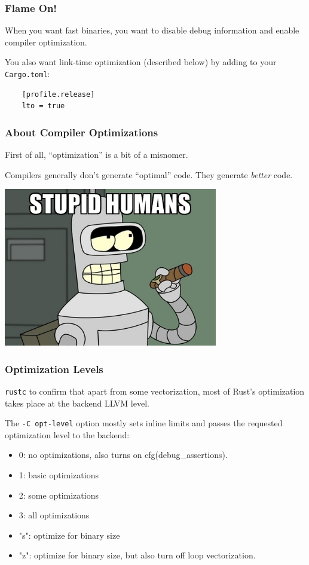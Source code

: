 \begin{frame}[fragile]
\frametitle{Flame On!}

When you want fast binaries, you want to disable debug information and enable compiler optimization.

 You also want link-time optimization (described below) by adding to your \texttt{Cargo.toml}:
\begin{verbatim}
    [profile.release]
    lto = true
\end{verbatim}
\end{frame}


\begin{frame}
\frametitle{About Compiler Optimizations}

First of all, ``optimization'' is
a bit of a misnomer. 

Compilers generally don't generate ``optimal'' code. They generate \emph{better} code.

\begin{center}
\includegraphics[width=0.7\textwidth]{images/bender.jpg}
\end{center}


\end{frame}


\begin{frame}
\frametitle{Optimization Levels}

\texttt{rustc} to confirm that apart from some vectorization, most of Rust's optimization takes place at the backend LLVM level.


The \texttt{-C opt-level} option mostly sets inline limits and passes the requested optimization level to the backend:

\begin{itemize}
\item    0: no optimizations, also turns on cfg(debug\_assertions).
\item    1: basic optimizations
\item    2: some optimizations
\item     3: all optimizations
\item    "s": optimize for binary size
\item    "z": optimize for binary size, but also turn off loop vectorization.
\end{itemize}

\end{frame}


